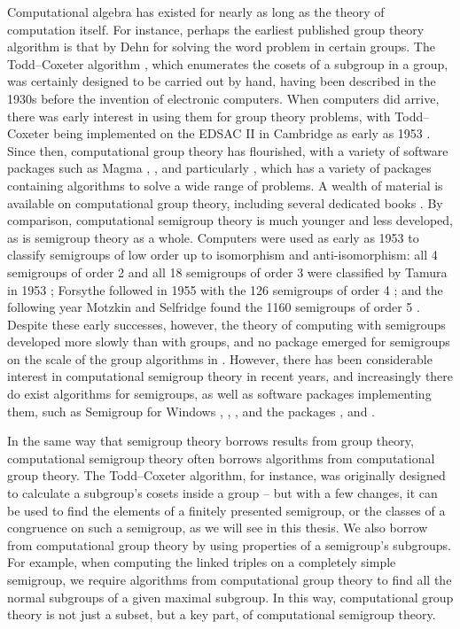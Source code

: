 Computational algebra has existed for nearly as long as the theory of
computation itself.  For instance, perhaps the earliest published group theory
algorithm is that by Dehn \cite{dehn_1911} for solving the word problem in
certain groups.  The Todd--Coxeter algorithm \cite{todd_coxeter_1936}, which
enumerates the cosets of a subgroup in a group, was certainly designed to be
carried out by hand, having been described in the 1930s before the invention of
electronic computers.  When computers did arrive, there was early interest in
using them for group theory problems, with Todd--Coxeter being implemented on
the EDSAC II in Cambridge as early as 1953 \cite{leech_1963}.  Since then,
computational group theory has flourished, with a variety of software packages
such as \textsf{Magma} \cite{magma}, \ACE{} \cite{ace}, and particularly \GAP{}
\cite{gap}, which has a variety of packages containing algorithms to solve a
wide range of problems.  A wealth of material is available on computational
group theory, including several dedicated books \cite{sims, cgt}.  By
comparison, computational semigroup theory is much younger and less developed,
as is semigroup theory as a whole.  Computers were used as early as 1953 to
classify semigroups of low order up to isomorphism and anti-isomorphism: all 4
semigroups of order 2 and all 18 semigroups of order 3 were classified by Tamura
in 1953 \cite{tamura_1953}; Forsythe followed in 1955 with the 126 semigroups of
order 4 \cite{order_4}; and the following year Motzkin and Selfridge found the
1160 semigroups of order 5 \cite{order_5, jurgensen_1977}.  Despite these early
successes, however, the
theory of computing with semigroups developed more slowly than with groups, and
no package emerged for semigroups on the scale of the group algorithms in
\GAP{}.  However, there has been considerable interest in computational
semigroup theory in recent years, and increasingly there do exist algorithms for
semigroups, as well as software packages implementing them, such as
\textsf{Semigroup for Windows} \cite{sgpwin}, \Semigroupe{} \cite{semigroupe},
\libsemigroups{} \cite{libsemigroups}, and the \GAP{} packages \Semigroups{}
\cite{semigroups}, \smallsemi{} \cite{smallsemi} and \kbmag{} \cite{kbmag}.

In the same way that semigroup theory borrows results from group theory,
computational semigroup theory often borrows algorithms from computational group
theory.  The Todd--Coxeter algorithm, for instance, was originally designed to
calculate a subgroup's cosets inside a group -- but with a few changes, it can
be used to find the elements of a finitely presented semigroup, or the classes
of a congruence on such a semigroup, as we will see in this thesis.  We also
borrow from computational group theory by using properties of a semigroup's
subgroups.  For example, when computing the linked triples on a completely
simple semigroup, we require algorithms from computational group theory to find
all the normal subgroups of a given maximal subgroup.  In this way,
computational group theory is not just a subset, but a key part, of
computational semigroup theory.

